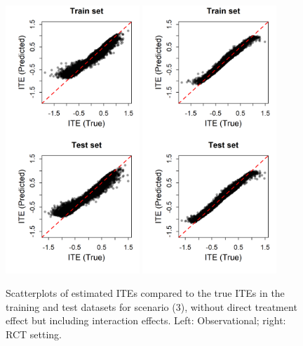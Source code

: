 \begin{figure}[htbp]
\centering
\includegraphics[width=0.45\textwidth]{img/results/observ_scenario3_ITE_scatter_train_test.png}
\includegraphics[width=0.45\textwidth]{img/results/rct_scenario3_ITE_scatter_train_test.png}
\caption{Scatterplots of estimated ITEs compared to the true ITEs in the training and test datasets for scenario (3), without direct treatment effect but including interaction effects. Left: Observational; right: RCT setting.}
\label{fig:scenario3_ite_scatter_train_test}
\end{figure}




